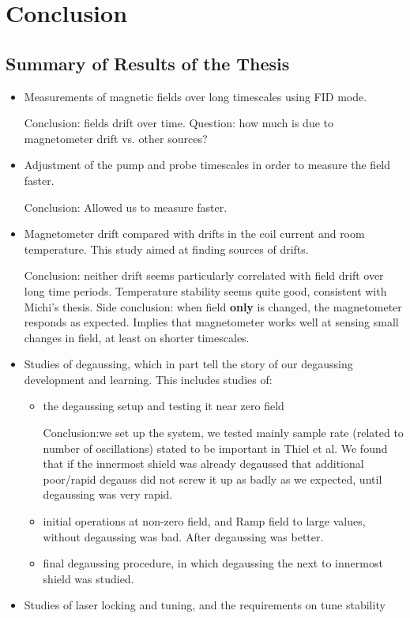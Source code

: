\chapter{Conclusion\label{ch:Conclusion}}
\section{Summary of Results of the Thesis}
\begin{itemize}
\item Measurements of magnetic fields over long timescales using FID mode.

Conclusion: fields drift over time.  Question: how much is due to
 magnetometer drift vs. other sources?

\item Adjustment of the pump and probe timescales in order to measure
  the field faster.
  
Conclusion: Allowed us to measure faster.
\item Magnetometer drift compared with drifts in the coil current and
  room temperature.  This study aimed at finding sources of drifts.
  
Conclusion: neither drift seems
particularly correlated with field drift over long time periods.
 Temperature stability seems quite good, consistent with Michi's
 thesis.  Side conclusion: when field {\bf only} is changed, the
 magnetometer responds as expected.  Implies that magnetometer works
 well at sensing small changes in field, at least on shorter
 timescales.
\item Studies of degaussing, which in part tell the story of our
  degaussing development and learning.  This includes studies of:
  \begin{itemize}
    \item the degaussing setup and testing it near zero field
    
Conclusion:we set up the
     system, we tested mainly sample rate (related to number of
     oscillations) stated to be important in Thiel et al.\cite{doi:10.1063/1.2713433}  We found
     that if the innermost shield was already degaussed that
     additional poor/rapid degauss did not screw it up as badly as we
     expected, until degaussing was very rapid.
    \item initial operations at non-zero field, and
Ramp field to large values, without
    degaussing was bad.  After degaussing was better.
    
    \item final degaussing procedure, in which degaussing the next to
      innermost shield was studied.
  \end{itemize}
\item Studies of laser locking and tuning, and the requirements on
  tune stability
  \end{itemize}
